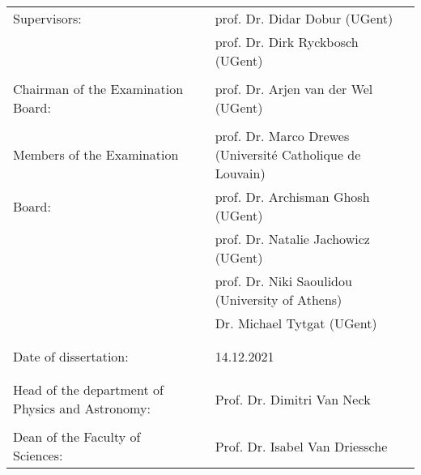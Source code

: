 
\begin{table}[t!]
    \vspace*{0.4\textheight}
\end{table}

\begin{table}[b!]
\begin{tabular}{p{}p{}p{}}
    Supervisors: &  &prof. Dr. Didar Dobur (UGent)\\
    &  &prof. Dr. Dirk Ryckbosch (UGent)\\ \\

    Chairman of the Examination Board: &  &prof. Dr. Arjen van der
                                             Wel (UGent)
  \\ \\
    Members of the Examination & &prof. Dr. Marco Drewes (Université Catholique de Louvain) \\
    Board: &  &prof. Dr. Archisman Ghosh (UGent) \\
    &  &prof. Dr. Natalie Jachowicz (UGent)\\
    &  &prof. Dr. Niki Saoulidou (University of Athens) \\
    &  &Dr. Michael Tytgat (UGent)  \\ \\ \\
   
    Date of dissertation: &  &14.12.2021 \\ \\ \\
Head of the department of Physics and Astronomy: & &
                                                       Prof. Dr. Dimitri Van Neck\\ \\
    Dean of the Faculty of Sciences: &  &Prof. Dr. Isabel Van Driessche 
    
\end{tabular}
\vspace*{-1.8\baselineskip}
\end{table}

\clearpage

